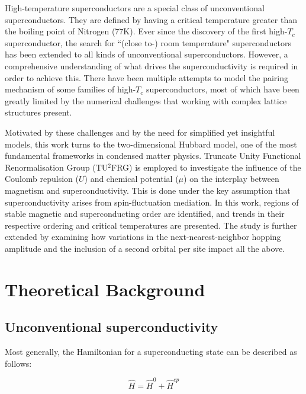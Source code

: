 \documentclass[12pt]{article}
\begin{document}
\medskip
\noindent High-temperature superconductors are a special class of unconventional superconductors. They are defined by having a critical temperature greater than the boiling point 
of Nitrogen (77K). Ever since the discovery of the first high-$T_c$ superconductor\cite{bednorz1986possible}, the search for ``(close to-) room temperature" superconductors has been extended to 
all kinds of unconventional superconductors. However, a comprehensive understanding of what drives the superconductivity is required in order 
to achieve this. There have been multiple attempts to model the pairing mechanism of some families of high-$T_c$ superconductors, most of which have
been greatly limited by the numerical challenges that working with complex lattice structures present.\par 

\medskip
\noindent Motivated by these challenges and by the need for simplified yet insightful models, this work turns to the two-dimensional Hubbard model, one of the most fundamental frameworks in condensed matter physics. Truncate Unity Functional Renormalisation Group (TU$^2$FRG)\cite{eckhardt2020truncated} is employed to 
investigate the influence of the Coulomb repulsion ($U$) and chemical potential ($\mu$) on the interplay between magnetism and superconductivity.
This is done under the key assumption that superconductivity arises from spin-fluctuation mediation.
In this work, regions of stable magnetic and superconducting order are identified, and trends in their respective ordering and critical temperatures are presented.
The study is further extended by examining how variations in the next-nearest-neighbor hopping amplitude and the inclusion of a second orbital per site impact all the above.





\section{Theoretical Background}

\subsection{Unconventional superconductivity}

\noindent Most generally, the Hamiltonian for a superconducting state can be described as follows:

\begin{equation}\label{General Hamiltonian}
    \hat{H} = \hat{H}^0 + \hat{H}^{cp}
\end{equation}
\end{document}
